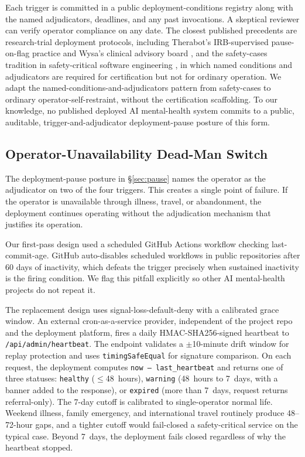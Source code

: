\documentclass[letterpaper]{article} %
\begin{document}
Each trigger is committed in a public deployment-conditions registry along with the named adjudicators, deadlines, and any past invocations. A skeptical reviewer can verify operator compliance on any date. The closest published precedents are research-trial deployment protocols, including Therabot's IRB-supervised pause-on-flag practice \citep{heinz2025therabot} and Wysa's clinical advisory board \citep{inkster2018wysa}, and the safety-cases tradition in safety-critical software engineering \citep{rtca2011do178c, sae1996arp4761}, in which named conditions and adjudicators are required for certification but not for ordinary operation. We adapt the named-conditions-and-adjudicators pattern from safety-cases to ordinary operator-self-restraint, without the certification scaffolding. To our knowledge, no published deployed AI mental-health system commits to a public, auditable, trigger-and-adjudicator deployment-pause posture of this form.

\subsection{Operator-Unavailability Dead-Man Switch}
\label{sec:deadman}

The deployment-pause posture in \S\ref{sec:pause} names the operator as the adjudicator on two of the four triggers. This creates a single point of failure. If the operator is unavailable through illness, travel, or abandonment, the deployment continues operating without the adjudication mechanism that justifies its operation.

Our first-pass design used a scheduled GitHub Actions workflow checking last-commit-age. GitHub auto-disables scheduled workflows in public repositories after 60 days of inactivity, which defeats the trigger precisely when sustained inactivity is the firing condition. We flag this pitfall explicitly so other AI mental-health projects do not repeat it.

The replacement design uses signal-loss-default-deny with a calibrated grace window. An external cron-as-a-service provider, independent of the project repo and the deployment platform, fires a daily HMAC-SHA256-signed heartbeat to \texttt{/api/admin/heartbeat}. The endpoint validates a $\pm$10-minute drift window for replay protection and uses \texttt{timingSafeEqual} for signature comparison. On each request, the deployment computes \texttt{now -- last\_heartbeat} and returns one of three statuses: \texttt{healthy} ($\le$48~hours), \texttt{warning} (48~hours to 7~days, with a banner added to the response), or \texttt{expired} (more than 7~days, request returns referral-only). The 7-day cutoff is calibrated to single-operator normal life. Weekend illness, family emergency, and international travel routinely produce 48--72-hour gaps, and a tighter cutoff would fail-closed a safety-critical service on the typical case. Beyond 7~days, the deployment fails closed regardless of why the heartbeat stopped.
\end{document}

